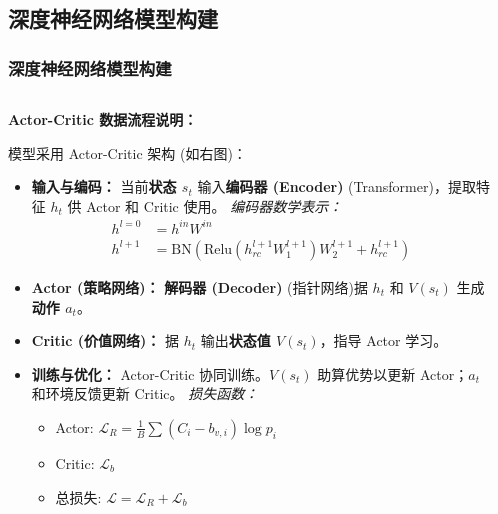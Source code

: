 \documentclass[10pt, aspectratio=169]{beamer}  %
\begin{document}
\subsection{深度神经网络模型构建}
\begin{frame}
	\frametitle{深度神经网络模型构建}
	\begin{columns}
		\begin{column}{0.5\textwidth}
			\footnotesize
			\textbf{Actor-Critic 数据流程说明：}

			模型采用 Actor-Critic 架构 (如右图)：
			\begin{itemize}
				\item \textbf{输入与编码：} 当前\textbf{状态 $s_t$} 输入\textbf{编码器 (Encoder)} (Transformer)，提取特征 $h_t$ 供 Actor 和 Critic 使用。
				      \textit{编码器数学表示：}
				      \begin{align*}
					      h^{l=0} & = h^{in} W^{in}                                                           \\
					      h^{l+1} & = \text{BN}(\text{Relu}(h_{rc}^{l+1} W_1^{l+1}) W_2^{l+1} + h_{rc}^{l+1})
				      \end{align*}

				\item \textbf{Actor (策略网络)：} \textbf{解码器 (Decoder)} (指针网络)据 $h_t$ 和 $V(s_t)$ 生成\textbf{动作 $a_t$}。

				\item \textbf{Critic (价值网络)：} 据 $h_t$ 输出\textbf{状态值 $V(s_t)$}，指导 Actor 学习。

				\item \textbf{训练与优化：}
				      Actor-Critic 协同训练。$V(s_t)$ 助算优势以更新 Actor；$a_t$ 和环境反馈更新 Critic。
				      \textit{损失函数：}
				      \begin{itemize}
					      \item Actor: $\mathcal{L}_{R} = \frac{1}{B}\sum (C_i - b_{v,i}) \log p_i$
					      \item Critic: $\mathcal{L}_{b}$
					      \item 总损失: $\mathcal{L} = \mathcal{L}_{R} + \mathcal{L}_{b}$
				      \end{itemize}
			\end{itemize}
		\end{column}
		\begin{column}{0.5\textwidth}
			\centering
\end{column}
\end{columns}
\end{frame}
\end{document}
